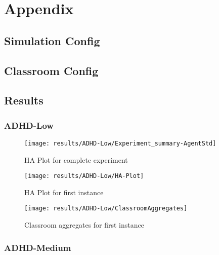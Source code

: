 \chapter{Appendix}

\label{ApxSimulationConfig}
\section{Simulation Config}


\label{ApxClassroomProfile}
\section{Classroom Config}


\label{ApxResults}


\section{Results}

\subsection{ADHD-Low}

\begin{figure}[H]
    \centering
    \texttt{[image: results/ADHD-Low/Experiment\_summary-AgentStd]}
    \caption{HA Plot for complete experiment}
\end{figure}

\begin{figure}[H]
    \centering
    \texttt{[image: results/ADHD-Low/HA-Plot]}
    \caption{HA Plot for first instance}
\end{figure}

\begin{figure}[H]
    \centering
    \texttt{[image: results/ADHD-Low/ClassroomAggregates]}
    \caption{Classroom aggregates for first instance}
\end{figure}


\subsection{ADHD-Medium}

